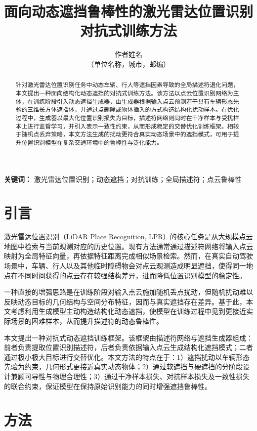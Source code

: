 \documentclass[UTF8,a4paper,12pt]{ctexart}
\title{\zihao{2}\bfseries 面向动态遮挡鲁棒性的激光雷达位置识别\\对抗式训练方法}
\author{\zihao{4} 作者姓名\\[0.2em]\zihao{-4} （单位名称，城市，邮编）}
\date{}
\begin{document}
\maketitle

\begin{abstract}
针对激光雷达位置识别任务中动态车辆、行人等遮挡因素导致的全局描述符退化问题，本文提出一种面向结构化动态遮挡的对抗式训练方法。该方法以点云位置识别网络为主体，在训练阶段引入动态遮挡生成器，由生成器根据输入点云预测若干具有车辆形态先验的三维长方体遮挡体，并通过点删除或物体插入的方式构造结构化扰动样本。在优化过程中，生成器以最大化位置识别损失为目标，描述符网络则同时在干净样本与受扰样本上进行监督学习，并引入表示一致性约束，从而形成稳定的交替优化训练框架。相较于随机点丢弃策略，本文方法生成的扰动更符合真实动态场景中的遮挡模式，可用于提升位置识别模型在复杂交通环境中的鲁棒性与泛化能力。
\end{abstract}

\noindent\textbf{关键词：} 激光雷达位置识别；动态遮挡；对抗训练；全局描述符；点云鲁棒性

\section{引言}
激光雷达位置识别（LiDAR Place Recognition, LPR）的核心任务是从大规模点云地图中检索与当前观测对应的历史位置。现有方法通常通过描述符网络将输入点云映射为全局特征向量，再依据特征距离完成相似场景检索。然而，在真实自动驾驶场景中，车辆、行人以及其他临时障碍物会对点云观测造成明显遮挡，使得同一地点在不同时间获得的点云存在较强结构差异，进而降低位置识别模型的稳定性。

一种直接的增强思路是在训练阶段对输入点云施加随机丢点扰动，但随机扰动难以反映动态目标的几何结构与空间分布特征，因而与真实遮挡存在差异。基于此，本文考虑利用生成模型主动构造结构化动态遮挡，使模型在训练过程中见到更接近实际场景的困难样本，从而提升描述符的动态鲁棒性。

本文提出一种对抗式动态遮挡训练框架。该框架由描述符网络与遮挡生成器组成：前者负责提取位置识别描述符，后者负责依据输入点云生成结构化遮挡模式；二者通过极小极大目标进行交替优化。本文方法的特点在于：1）遮挡扰动以车辆形态先验为约束，几何形式更接近真实动态物体；2）通过软遮挡与硬遮挡的分阶段设计兼顾可导性与物理合理性；3）通过干净样本损失、对抗样本损失及一致性损失的联合约束，保证模型在保持原始识别能力的同时增强遮挡鲁棒性。

\section{方法}
\end{document}
